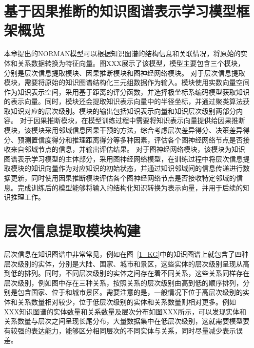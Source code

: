\documentclass[algorithmlist, AutoFakeBold, AutoFakeSlant, figurelist, tablelist, nomlist, masters]{seuthesix}
\begin{document}
\section{基于因果推断的知识图谱表示学习模型框架概览}
本章提出的NORMAN模型可以根据知识图谱的结构信息和关联情况，将原始的实体和关系数据转换为特征向量。图XXX展示了该模型，模型主要包含三个模块，分别是层次信息提取模块、因果推断模块和图神经网络模块。
对于层次信息提取模块，需要将原始的知识图谱结构化三元组数据作为输入。模块使用实数向量空间作为知识表示空间，采用基于距离的评分函数，并选择极坐标系编码模型获取知识的表示向量。同时，模块还会提取知识表示向量中的半径坐标，并通过聚类算法获取知识对应的层次级别。模块的输出包括知识表示向量和知识层次级别两部分内容。
对于因果推断模块，在模型训练过程中需要将知识表示向量提供给因果推断模块，该模块采用邻域信息因果干预的方法，综合考虑层次差异得分、决策差异得分、预测置信度得分和推理距离得分等多种因素，评估各个图神经网络节点是否接收来自邻域节点的信息，并输出评估结果。
对于图神经网络模块，该模块为知识图谱表示学习模型的主体部分，采用图神经网络模型，在训练过程中将层次信息提取模块的知识向量作为对应知识的初始状态，并通过知识邻域间的信息传递进行数据更新，同时使用因果推断模块评估各个图神经网络节点是否接收特定邻域的信息。完成训练后的模型能够将输入的结构化知识转换为表示向量，并用于后续的知识推理工作。

\section{层次信息提取模块构建}
层次信息在知识图谱中非常常见，例如在图~\ref{1_KG}中的知识图谱上就包含了四种层次级别的实体，分别是大陆、国家、城市和景区，这些实体的层次级别呈现从高到低的排列。同时，不同层次级别的实体之间存在着不同关系，这些关系同样存在层次级别，例如图中存在三种关系，按照关系的层次级别由高到低的顺序排列，分别是包含国家、位于和城市景区。需要注意的是，一般情况下位于高层次级别的实体和关系数量相对较少，位于低层次级别的实体和关系数量则相对更多。例如XXX知识图谱的实体数量和关系数量及层次分布如图XXX所示，可以发现实体和关系数量与层次之间呈现长尾分布，大量数据集中在低层次级别，这就需要模型要有较强的表达能力，能够区分相同层次的不同实体与关系，同时尽量减少表示误差。
\end{document}
